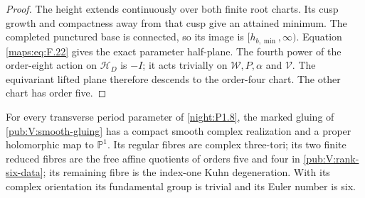 \begin{proof}
The height extends continuously over both finite root charts.
Its cusp growth and compactness away from that cusp give an
attained minimum. The completed punctured base is connected, so
its image is $[h_{b,\min},\infty)$. Equation
\eqref{maps:eq:F.22} gives the exact parameter half-plane.
The fourth power of the order-eight action on $\mathcal H_D$
is $-I$; it acts trivially on $\mathcal W,P,\alpha$ and
$\mathcal V$. The equivariant lifted plane therefore descends
to the order-four chart. The other chart has order five.
\end{proof}












\begin{theorem}\hypertarget{tag-02O9}{}\label{maps:src:F.3.7}\hypertarget{tag-02QJ}{}\label{night:P1.10}

For every transverse period parameter of \cref{night:P1.8}, the
marked gluing of \cref{pub:V:smooth-gluing} has a compact smooth
complex realization and a proper holomorphic map to $\mathbb P^1$.
Its regular fibres are complex three-tori; its two finite reduced
fibres are the free affine quotients of orders five and four in
\cref{pub:V:rank-six-data}; its remaining fibre is the index-one
Kuhn degeneration. With its complex orientation its fundamental
group is trivial and its Euler number is six.

\end{theorem}



